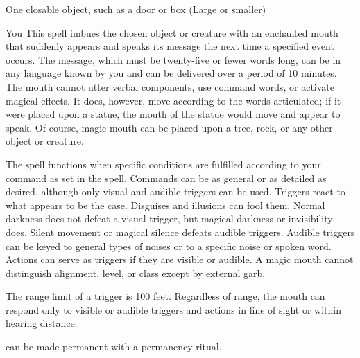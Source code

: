 \begin{spelltarget}{One closable object, such as a door or box (Large or smaller)}
\begin{spelltarget}{You}
\spelleffect This spell imbues the chosen object or creature with an enchanted mouth that suddenly appears and speaks its message the next time a specified event occurs. The message, which must be twenty-five or fewer words long, can be in any language known by you and can be delivered over a period of 10 minutes. The mouth cannot utter verbal components, use command words, or activate magical effects. It does, however, move according to the words articulated; if it were placed upon a statue, the mouth of the statue would move and appear to speak. Of course, magic mouth can be placed upon a tree, rock, or any other object or creature.
\par The spell functions when specific conditions are fulfilled according to your command as set in the spell. Commands can be as general or as detailed as desired, although only visual and audible triggers can be used. Triggers react to what appears to be the case. Disguises and illusions can fool them. Normal darkness does not defeat a visual trigger, but magical darkness or invisibility does. Silent movement or magical silence defeats audible triggers. Audible triggers can be keyed to general types of noises or to a specific noise or spoken word. Actions can serve as triggers if they are visible or audible. A magic mouth cannot distinguish alignment, level, or class except by external garb.
\par The range limit of a trigger is 100 feet. Regardless of range, the mouth can respond only to visible or audible triggers and actions in line of sight or within hearing distance.
\spellnotes \par {} can be made permanent with a permanency ritual.


\end{spelltarget}
\end{spelltarget}
